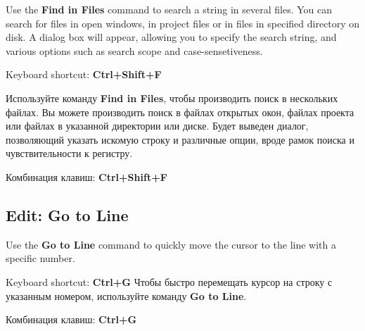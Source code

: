 \ifenglish
Use the {\bf Find in Files} command to search a string in several files.
You can search for files in open windows, in project files or in files in
specified directory on disk.
A dialog box will appear, allowing you to
specify the search string, and various options such as search scope and
case-sensetiveness.

Keyboard shortcut: {\bf Ctrl+Shift+F}

\else
Используйте команду {\bf Find in Files}, чтобы производить поиск в нескольких
файлах. Вы можете производить поиск в файлах открытых окон, файлах проекта
или файлах в указанной директории или диске.
Будет выведен диалог, позволяющий указать искомую строку и различные опции,
вроде рамок поиска и чувствительности к регистру.

Комбинация клавиш: {\bf Ctrl+Shift+F}
\fi
\subsection{Edit: Go to Line}

\ifenglish
Use the {\bf Go to Line} command to quickly move the cursor
to the line with a specific number.

Keyboard shortcut: {\bf Ctrl+G}
\else
Чтобы быстро перемещать курсор на строку с указанным номером, 
используйте команду {\bf Go to Line}.

Комбинация клавиш: {\bf Ctrl+G}
\fi